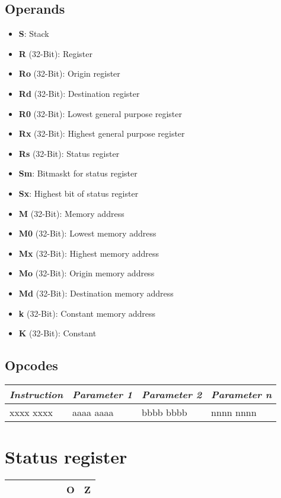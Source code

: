 \documentclass[titlepage]{scrartcl}
\begin{document}
\subsection{Operands}
\begin{itemize}
	\item \textbf{S}: Stack
	\item \textbf{R} (32-Bit): Register
	\item \textbf{Ro} (32-Bit): Origin register
	\item \textbf{Rd} (32-Bit): Destination register
	\item \textbf{R0} (32-Bit): Lowest general purpose register
	\item \textbf{Rx} (32-Bit): Highest general purpose register \vspace{1ex}
	\item \textbf{Rs} (32-Bit): Status register
	\item \textbf{Sm}: Bitmaskt for status register
	\item \textbf{Sx}: Highest bit of status register \vspace{1ex}
	\item \textbf{M} (32-Bit): Memory address
	\item \textbf{M0} (32-Bit): Lowest memory address
	\item \textbf{Mx} (32-Bit): Highest memory address
	\item \textbf{Mo} (32-Bit): Origin memory address
	\item \textbf{Md} (32-Bit): Destination memory address
	\item \textbf{k} (32-Bit): Constant memory address \vspace{1ex}
	\item \textbf{K} (32-Bit): Constant
\end{itemize}
\subsection{Opcodes}
{
	\renewcommand{\arraystretch}{1.5}
	\begin{tabularx}{\textwidth}{|Y|Y|Y|Y|}
		\hline
		\itshape{Instruction} & \itshape{Parameter 1} & \itshape{Parameter 2} & \itshape{Parameter n} \\
		\hline
		xxxx xxxx             & aaaa aaaa             & bbbb bbbb             & nnnn nnnn             \\
		\hline
	\end{tabularx}
}
\newpage

\section{Status register}
 {
  \renewcommand{\arraystretch}{1.5}
  \begin{tabularx}{\textwidth}{|Y|Y|Y|Y|Y|Y|Y|Y|}
	  \hline
	   &  &  &  &  &  & \textbf{O} & \textbf{Z} \\
	  \hline
  \end{tabularx}
 }
\end{document}

